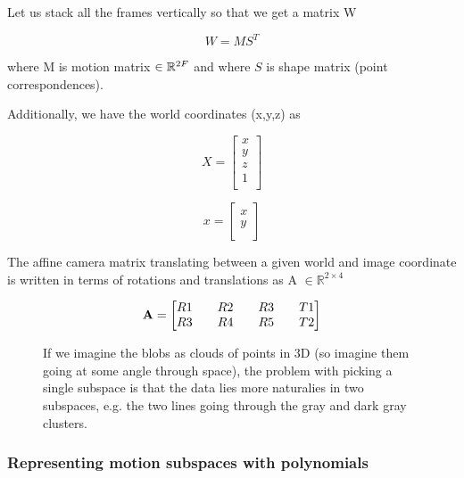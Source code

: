 \documentclass[a4paper]{article}
\begin{document}
Let us stack all the frames vertically so that we get a matrix W

$$W = MS^T$$

where M is motion matrix $\in \mathbb{R}^{2F \time 4}$ and where $S$ is shape matrix (point correspondences).

Additionally, we have the world coordinates (x,y,z) as

\begin{equation} X = \begin{bmatrix} x \\ y \\ z \\ 1 \\ \end{bmatrix} \end{equation}


\begin{equation} x = \begin{bmatrix} x \\ y \\ \end{bmatrix} \end{equation}



The affine camera matrix translating between a given world and image coordinate is written in terms of rotations and translations as A $\in
\mathbb{R}^{2 \times 4}$

\begin{equation} {\bf A} = \begin{bmatrix} R1 && R2 && R3 && T1 \\ R3 && R4 && R5 && T2 \\ \end{bmatrix} \end{equation}

 \begin{figure} \centering
     \caption{If we imagine the blobs as clouds of points in 3D (so imagine them going at some angle through space), the  problem with picking a
 single subspace is that the data lies more naturalies in two subspaces, e.g. the two lines going through the gray and dark gray clusters.}
 \end{figure}

\subsubsection{Representing motion subspaces with polynomials}
\end{document}

